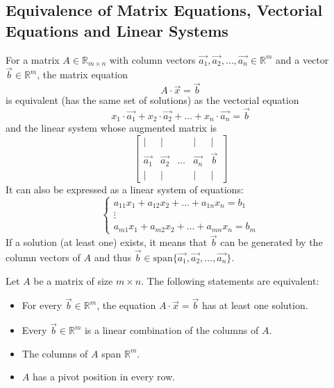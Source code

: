 \subsection{Equivalence of Matrix Equations, Vectorial Equations and Linear Systems}
For a matrix $A \in \mathbb{R}_{m \times n}$ with column vectors $\vec{a_1}, \vec{a_2}, \ldots, \vec{a_n} \in \mathbb{R}^m$ and a vector $\vec{b} \in \mathbb{R}^m$, the matrix equation 
\[
    A \cdot \vec{x} = \vec{b}
\]
is equivalent (has the same set of solutions) as the vectorial equation 
\[
    x_1 \cdot \vec{a_1} + x_2 \cdot \vec{a_2} + \ldots + x_n \cdot \vec{a_n} = \vec{b}
\]
and the linear system whose augmented matrix is
\[
    \begin{bmatrix}
    | & | & & | & | \\
    \vec{a_1} & \vec{a_2} & \ldots & \vec{a_n} & \vec{b} \\
    | & | & & | & | 
    \end{bmatrix}
\]
It can also be expressed as a linear system of equations:
\[
    \begin{cases}
        a_{11}x_1 + a_{12}x_2 + \ldots + a_{1n}x_n = b_1 \\
        \vdots \\
        a_{m1}x_1 + a_{m2}x_2 + \ldots + a_{mn}x_n = b_m
    \end{cases}
\]
If a solution (at least one) exists, it means that $\vec{b}$ can be generated by the column vectors of $A$ and thus $\vec{b} \in \text{span}\{\vec{a_1}, \vec{a_2}, \ldots, \vec{a_n}\}$.
\begin{theorem}
    Let $A$ be a matrix of size $m \times n$. The following statements are equivalent:
    \begin{itemize}[itemsep=1pt,label=$\circ$]
        \item For every $\vec{b} \in \mathbb{R}^m$, the equation $A \cdot \vec{x} = \vec{b}$ has at least one solution.
        \item Every $\vec{b} \in \mathbb{R}^m$ is a linear combination of the columns of $A$.
        \item The columns of $A$ span $\mathbb{R}^m$.
        \item $A$ has a pivot position in every row.
    \end{itemize}
\end{theorem}

